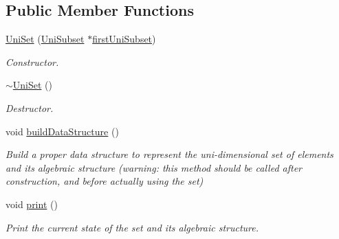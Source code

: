 \subsection*{Public Member Functions}
\begin{DoxyCompactItemize}
\item 
\hyperlink{classUniSet_a7e7a24e0c074fff21442f8ac9c5cd6aa}{Uni\-Set} (\hyperlink{classUniSubset}{Uni\-Subset} $\ast$\hyperlink{classUniSet_a8b2ca464176feddcd8d96c75514eba6b}{first\-Uni\-Subset})
\begin{DoxyCompactList}\small\item\em Constructor. \end{DoxyCompactList}\item 
\hypertarget{classUniSet_a702d623676d4b30b832bdf17c1768fbe}{\hyperlink{classUniSet_a702d623676d4b30b832bdf17c1768fbe}{$\sim$\-Uni\-Set} ()}\label{classUniSet_a702d623676d4b30b832bdf17c1768fbe}

\begin{DoxyCompactList}\small\item\em Destructor. \end{DoxyCompactList}\item 
\hypertarget{classUniSet_a0ce5a8030b92cbbf2a810eb03bf65846}{void \hyperlink{classUniSet_a0ce5a8030b92cbbf2a810eb03bf65846}{build\-Data\-Structure} ()}\label{classUniSet_a0ce5a8030b92cbbf2a810eb03bf65846}

\begin{DoxyCompactList}\small\item\em Build a proper data structure to represent the uni-\/dimensional set of elements and its algebraic structure (warning\-: this method should be called after construction, and before actually using the set) \end{DoxyCompactList}\item 
\hypertarget{classUniSet_a6a7601a93553783b443f4b4c65e3b1e8}{void \hyperlink{classUniSet_a6a7601a93553783b443f4b4c65e3b1e8}{print} ()}\label{classUniSet_a6a7601a93553783b443f4b4c65e3b1e8}

\begin{DoxyCompactList}\small\item\em Print the current state of the set and its algebraic structure. \end{DoxyCompactList}\end{DoxyCompactItemize}
